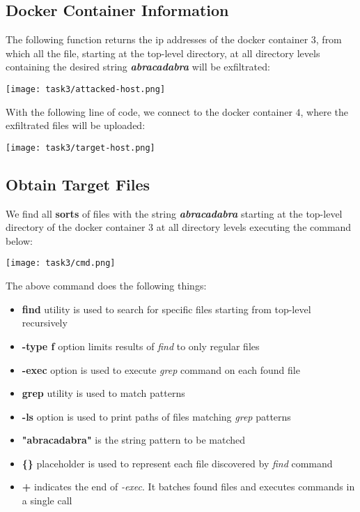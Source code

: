 \documentclass{article}
\begin{document}
  \subsection{Docker Container Information}
 The following function returns the ip addresses of the docker container $3$, from which all the file, starting at the top-level directory, at all directory levels containing the desired string \textbf{\textit{abracadabra}} will be exfiltrated:
\begin{center}
    \texttt{[image: task3/attacked-host.png]}
\end{center}

With the following line of code, we connect to the docker container $4$, where the exfiltrated files will be uploaded:
\begin{center}
    \texttt{[image: task3/target-host.png]}
\end{center}


\subsection{Obtain Target Files}
We find all \textbf{sorts} of files with the string \textbf{\textit{abracadabra}} starting at the top-level directory of the docker container $3$ at all directory levels executing the command below:
\begin{center}
    \texttt{[image: task3/cmd.png]}
\end{center}

The above command does the following things:
\begin{itemize}
    \item \textbf{find} utility is used to search for specific files starting from top-level recursively
    \item \textbf{-type f} option limits results of \textit{find} to only regular files
    \item \textbf{-exec} option is used to execute \textit{grep} command on each found file
    \item \textbf{grep} utility is used to match patterns
    \item \textbf{-ls} option is used to print paths of files matching \textit{grep} patterns
    \item \textbf{"abracadabra"} is the string pattern to be matched
    \item \textbf{\{\}} placeholder is used to represent each file discovered by \textit{find} command
    \item \textbf{+} indicates the end of \textit{-exec}. It batches found files and executes commands in a single call
\end{itemize}
\end{document}
